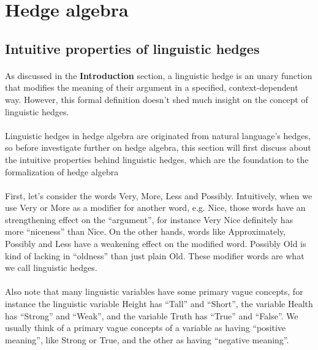\documentclass[part1.tex]{subfiles}
\begin{document}
\section{Hedge algebra}
\subsection{Intuitive properties of linguistic hedges}
\paragraph{} As discussed in the {\bfseries Introduction}
section, a linguistic hedge is an unary function that modifies
the meaning of their argument in a specified, context-dependent
way. However, this formal definition doesn't shed much insight on
the concept of linguistic hedges.
\paragraph{} Linguistic hedges in hedge algebra are originated
from natural language's hedges, so before investigate further on
hedge algebra, this section will first discuss about the
intuitive properties behind linguistic hedges, which are the
foundation to the formalization of hedge algebra
\paragraph{} First, let's consider the words Very, More, Less
and Possibly. Intuitively, when we use Very or More
as a modifier for another word, e.g. Nice, those words have an
strengthening effect on the ``argument'', for instance Very Nice
definitely has more ``niceness'' than Nice. On the other hands,
words like Approximately, Possibly and Less have a weakening
effect on the modified word. Possibly Old is kind of lacking in
``oldness'' than just plain Old. These modifier words are what we
call linguistic hedges.
\paragraph{} Also note that many linguistic variables have some
primary vague concepts, for instance the linguistic variable
Height has ``Tall'' and ``Short'', the variable Health has
``Strong'' and ``Weak'', and the variable Truth has ``True'' and
``False''. We usually think of a primary vague concepts of a
variable as having ``positive meaning'', like Strong or True, and the other
as having ``negative meaning''.
\end{document}
